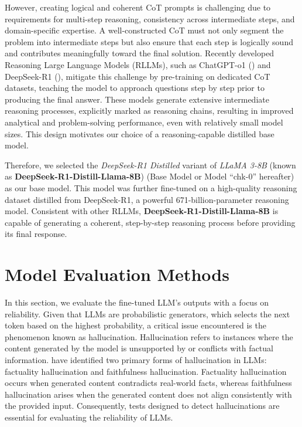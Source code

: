 However, creating logical and coherent CoT prompts is challenging due to requirements for multi-step reasoning, consistency across intermediate steps, and domain-specific expertise. A well-constructed CoT must not only segment the problem into intermediate steps but also ensure that each step is logically sound and contributes meaningfully toward the final solution. Recently developed Reasoning Large Language Models (RLLMs), such as ChatGPT-o1 (\cite{jaech2024openai}) and DeepSeek-R1 (\cite{shao2024deepseekmath}), mitigate this challenge by pre-training on dedicated CoT datasets, teaching the model to approach questions step by step prior to producing the final answer. These models generate extensive intermediate reasoning processes, explicitly marked as reasoning chains, resulting in improved analytical and problem-solving performance, even with relatively small model sizes. This design motivates our choice of a reasoning-capable distilled base model.


Therefore, we selected the \textit{DeepSeek-R1 Distilled} variant of \textit{LLaMA 3-8B} (known as \textbf{DeepSeek-R1-Distill-Llama-8B}) (Base Model or Model ``chk-0'' hereafter) as our base model. This model was further fine-tuned on a high-quality reasoning dataset distilled from DeepSeek-R1, a powerful 671-billion-parameter reasoning model. Consistent with other RLLMs, \textbf{DeepSeek-R1-Distill-Llama-8B} is capable of generating a coherent, step-by-step reasoning process before providing its final response.









\section{Model Evaluation Methods}\label{ch2:sec:application}


In this section, we evaluate the fine-tuned LLM's outputs with a focus on reliability. Given that LLMs are probabilistic generators, which selects the next token based on the highest probability, a critical issue encountered is the phenomenon known as hallucination. Hallucination refers to instances where the content generated by the model is unsupported by or conflicts with factual information. \cite{huang2025survey} have identified two primary forms of hallucination in LLMs: factuality hallucination and faithfulness hallucination. Factuality hallucination occurs when generated content contradicts real-world facts, whereas faithfulness hallucination arises when the generated content does not align consistently with the provided input. Consequently, tests designed to detect hallucinations are essential for evaluating the reliability of LLMs.




